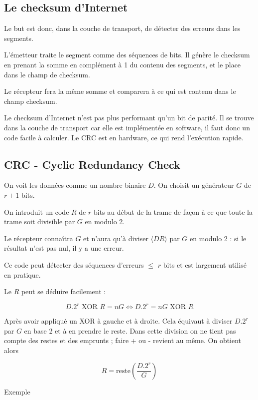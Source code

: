 	\subsection{Le checksum d'Internet}
	
	Le but est donc, dans la couche de transport, de détecter des erreurs dans les segments.
	
	L'émetteur traite le segment comme des séquences de bits. Il génère le checksum en prenant la somme en complément à 1 du contenu des segments, et le place dans le champ de checksum.
	
	Le récepteur fera la même somme et comparera à ce qui est contenu dans le champ checksum.

	Le checksum d'Internet n'est pas plus performant qu'un bit de parité. Il se trouve dans la couche de transport car elle est implémentée en software, il faut donc un code facile à calculer. Le CRC est en hardware, ce qui rend l'exécution rapide.

	\subsection{CRC - Cyclic Redundancy Check}
	
	On voit les données comme un nombre binaire $D$. On choisit un générateur $G$ de $r + 1$ bits.
	
	On introduit un code $R$ de $r$ bits au début de la trame de façon à ce que toute la trame soit divisible par $G$ en modulo 2.
	
	Le récepteur connaîtra $G$ et n'aura qu'à diviser $\langle D R \rangle$ par $G$ en modulo 2 : si le résultat n'est pas nul, il y a une erreur.
	
	
	Ce code peut détecter des séquences d'erreurs $\leq$ $r$ bits et est largement utilisé en pratique.
			
	Le $R$ peut se déduire facilement :
	
	$$D . 2^r \text{ XOR } R = n G \Leftrightarrow D.2^r = nG \text{ XOR } R$$
	
	Après avoir appliqué un XOR à gauche et à droite. Cela équivaut à diviser $D.2^r$ par $G$ en base 2 et à en prendre le reste. Dans cette division on ne tient pas compte des restes et des emprunts ; faire + ou - revient au même. On obtient alors
	
	$$R = \text{reste}( \frac{D . 2^r}{G} )$$
	
	Exemple
	
	
